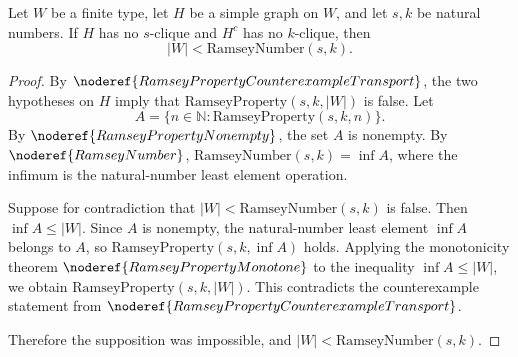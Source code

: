 \begin{helper}
Let \(W\) be a finite type, let \(H\) be a simple graph on \(W\), and let
\(s,k\) be natural numbers.  If \(H\) has no \(s\)-clique and \(H^{c}\) has no
\(k\)-clique, then
\[
  |W| < \mathrm{RamseyNumber}(s,k).
\]
\end{helper}
\begin{proof}
By \(\noderef{RamseyPropertyCounterexampleTransport}\), the two hypotheses on
\(H\) imply that
\(\mathrm{RamseyProperty}(s,k,|W|)\) is false.  Let
\[
  A=\{n\in\mathbb{N}:\mathrm{RamseyProperty}(s,k,n)\}.
\]
By \(\noderef{RamseyPropertyNonempty}\), the set \(A\) is nonempty.  By
\(\noderef{RamseyNumber}\), \(\mathrm{RamseyNumber}(s,k)=\inf A\), where the
infimum is the natural-number least element operation.

Suppose for contradiction that \(|W|<\mathrm{RamseyNumber}(s,k)\) is false.
Then \(\inf A\le |W|\).  Since \(A\) is nonempty, the natural-number least
element \(\inf A\) belongs to \(A\), so
\(\mathrm{RamseyProperty}(s,k,\inf A)\) holds.  Applying the monotonicity
theorem \(\noderef{RamseyPropertyMonotone}\) to the inequality
\(\inf A\le |W|\), we obtain \(\mathrm{RamseyProperty}(s,k,|W|)\).  This
contradicts the counterexample statement from
\(\noderef{RamseyPropertyCounterexampleTransport}\).

Therefore the supposition was impossible, and \(|W|<\mathrm{RamseyNumber}(s,k)\).
\end{proof}
